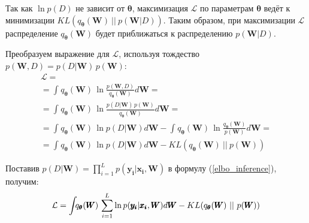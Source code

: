 \documentclass{article}
\numberwithin{equation}{section}
\begin{document}
    Так как $\ln{p(D)}$ не зависит от $\pmb{\theta}$,
    максимизация $\mathcal{L}$ по параметрам $\pmb{\theta}$
    ведёт к минимизации
    $KL(q_{\pmb{\theta}}(\pmb{W})~||~p(\pmb{W}| D))$.
    Таким образом, при максимизации $\mathcal{L}$
    распределение $q_{\pmb{\theta}}(\pmb{W})$
    будет приближаться к распределению $p(\pmb{W}| D)$.

    Преобразуем выражение для $\mathcal{L}$, используя тождество $p(\pmb{W}, D) = p(D | \pmb{W}) \, p(\pmb{W})$:
    \begin{equation}\label{elbo_inference}
    \begin{split}
        \mathcal{L}
        = \\
        =
            \int_{}{
                q_{\pmb{\theta}}(\pmb{W})
                \,
                \ln{
                    \frac
                        {p(\pmb{W}, D)}
                        {q_{\pmb{\theta}}(\pmb{W})}
                }
                d\pmb{W}
            }
        = \\
        =
            \int_{}{
                q_{\pmb{\theta}}(\pmb{W})
                \,
                \ln{
                    \frac
                        {
                            p(D | \pmb{W})
                            \,
                            p(\pmb{W})
                        }
                        {q_{\pmb{\theta}}(\pmb{W})}
                }
                d\pmb{W}
            }
        = \\
        =
            \int_{}{
                q_{\pmb{\theta}}(\pmb{W})
                \,
                \ln{
                    p(D | \pmb{W})
                }
                d\pmb{W}
            }
            -
            \int_{}{
                q_{\pmb{\theta}}(\pmb{W})
                \,
                \ln{
                    \frac
                        {q_{\pmb{\theta}}(\pmb{W})}
                        {p(\pmb{W})}
                }
                d\pmb{W}
            }
        = \\
        =
            \int_{}{
                q_{\pmb{\theta}}(\pmb{W})
                \,
                \ln{
                    p(D | \pmb{W})
                }
                d\pmb{W}
            }
            -
            KL(
                q_{\pmb{\theta}}(\pmb{W})~||~p(\pmb{W})
            )
    \end{split}
    \end{equation}

    Поставив
    $
        p(D | \pmb{W})
        =
        \prod_{i=1}^{L}{
            p(\pmb{y_i} | \pmb{x_i}, \pmb{W})
        }
    $
    в формулу (\ref{elbo_inference}), получим:
    \begin{equation}{\label{elbo_inference_ln}}
        \mathcal{L}
        =
            \int_{}{
                q_{\pmb{\theta}}(\pmb{W})
                \,
                \sum_{i=1}^{L}{
                    \ln{
                        p(\pmb{y_{i}} | \pmb{x_{i}}, \pmb{W})
                    }
                }
                d\pmb{W}
            }
            -
            KL(
                q_{\pmb{\theta}}(\pmb{W})~||~p(\pmb{W})
            )
    \end{equation}
\end{document}

